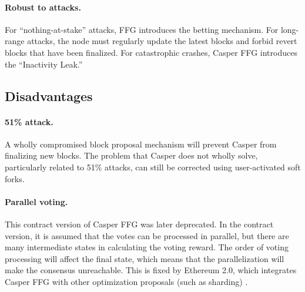 \documentclass[lang=en]{sjtuarticle}
\begin{document}
\paragraph{Robust to attacks.} For ``nothing-at-stake'' attacks, FFG introduces the betting mechanism. For long-range attacks, the node must regularly update the latest blocks and forbid revert blocks that have been finalized. For catastrophic crashes, Casper FFG introduces the “Inactivity Leak.”

\subsection{Disadvantages}

\paragraph{51\% attack.} A wholly compromised block proposal mechanism will prevent Casper
from finalizing new blocks. The problem that Casper does not wholly solve, particularly related to 51\% attacks, can still be corrected using
user-activated soft forks.

\paragraph{Parallel voting.} This contract version of Casper FFG was later deprecated. \cite{deprecate} In the contract version, it is assumed that the votes can be processed in parallel, but there are many intermediate states in calculating the voting reward. The order of voting processing will affect the final state, which means that the parallelization will make the consensus unreachable. This is fixed by Ethereum 2.0, which integrates Casper FFG with other optimization proposals (such as sharding) \cite{eth2}.

\printbibliography
\end{document}
